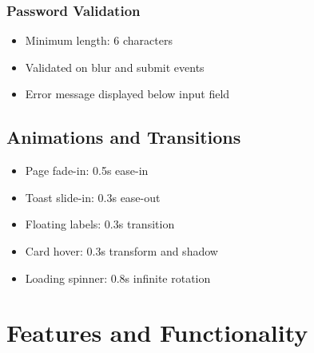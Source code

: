 \documentclass[12pt,a4paper]{article}
\begin{document}
\subsubsection{Password Validation}
\begin{itemize}
    \item Minimum length: 6 characters
    \item Validated on blur and submit events
    \item Error message displayed below input field
\end{itemize}

\subsection{Animations and Transitions}
\begin{itemize}
    \item Page fade-in: 0.5s ease-in
    \item Toast slide-in: 0.3s ease-out
    \item Floating labels: 0.3s transition
    \item Card hover: 0.3s transform and shadow
    \item Loading spinner: 0.8s infinite rotation
\end{itemize}

\section{Features and Functionality}
\end{document}
